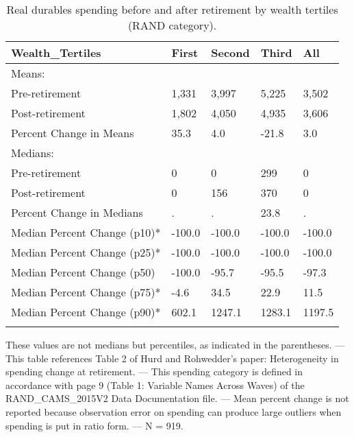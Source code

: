\begin{table}[tbp] \centering
{}

\caption{Real durables spending before and after retirement by wealth tertiles (RAND category).}
\begin{tabularx}{\textwidth}{lCCCC}

\toprule
{Wealth\_Tertiles}&{First}&{Second}&{Third}&{All} \tabularnewline
\midrule\addlinespace[1.5ex]
Means:&&&& \tabularnewline
\midrule Pre-retirement&1,331&3,997&5,225&3,502 \tabularnewline
Post-retirement&1,802&4,050&4,935&3,606 \tabularnewline
Percent Change in Means&35.3&4.0&-21.8&3.0 \tabularnewline
\midrule Medians:&&&& \tabularnewline
\midrule Pre-retirement&0&0&299&0 \tabularnewline
Post-retirement&0&156&370&0 \tabularnewline
Percent Change in Medians&.&.&23.8&. \tabularnewline
Median Percent Change (p10)*&-100.0&-100.0&-100.0&-100.0 \tabularnewline
Median Percent Change (p25)*&-100.0&-100.0&-100.0&-100.0 \tabularnewline
Median Percent Change (p50)&-100.0&-95.7&-95.5&-97.3 \tabularnewline
Median Percent Change (p75)*&-4.6&34.5&22.9&11.5 \tabularnewline
Median Percent Change (p90)*&602.1&1247.1&1283.1&1197.5 \tabularnewline
\bottomrule \addlinespace[1.5ex]

\end{tabularx}
\begin{flushleft}
\footnotesize *These values are not medians but percentiles, as indicated in the parentheses. \linebreak --- \linebreak This table references Table 2 of Hurd and Rohwedder's paper: Heterogeneity in spending change at retirement. \linebreak --- \linebreak This spending category is defined in accordance with page 9 (Table 1: Variable Names Across Waves) of the RAND\_CAMS\_2015V2 Data Documentation file. \linebreak --- \linebreak Mean percent change is not reported because observation error on spending can produce large outliers when spending is put in ratio form. \linebreak --- \linebreak N = 919.
\end{flushleft}
\end{table}

